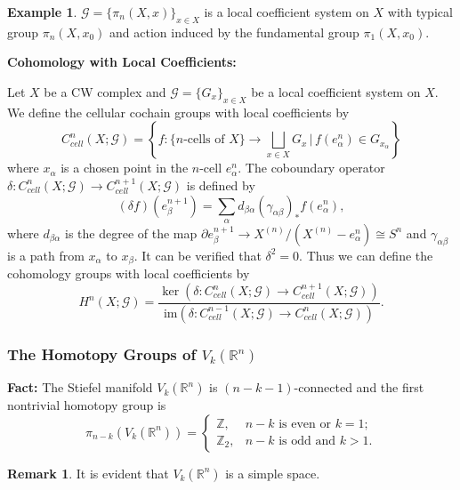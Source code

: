 \documentclass[12pt,a4paper]{article}
\theoremstyle{definition}
\newtheorem{example}[theorem]{\indent Example}
\newtheorem*{remark}{\noindent Remark}
\newcommand{\mZ}{\mathbb{Z}}
\newcommand{\mR}{\mathbb{R}}
\newcommand{\p}{\partial}
\begin{document}
\begin{example}
    $\mathcal{G} = \{\pi_n(X,x)\}_{x\in X}$ is a local coefficient system 
    on $X$ with typical group $\pi_n(X,x_0)$ and action induced by the 
    fundamental group $\pi_1(X,x_0)$.
\end{example}

\noindent\textbf{Cohomology with Local Coefficients:}

Let $X$ be a CW complex and $\mathcal{G} = \{G_x\}_{x\in X}$ be a local
coefficient system on $X$. We define the cellular cochain groups with local
coefficients by
\begin{equation*}
    C^n_{cell}(X;\mathcal{G}) = \left\{f:\big\{\text{$n$-cells of $X$}\big\}
    \to \bigsqcup_{x\in X}G_x \,\Big|\, f(e_\alpha^n)\in 
    G_{x_\alpha}\right\}
\end{equation*}
where $x_\alpha$ is a chosen point in the $n$-cell $e_\alpha^n$. The 
coboundary operator 
$\delta:C^n_{cell}(X;\mathcal{G})\to C^{n+1}_{cell}(X;\mathcal{G})$
is defined by 
\begin{equation*}
    (\delta f)(e_\beta^{n+1}) = \sum_\alpha d_{\beta\alpha}
    (\gamma_{\alpha\beta})_*f(e_\alpha^n),
\end{equation*}
where $d_{\beta\alpha}$ is the degree of the map 
$\p e_\beta^{n+1}\to X^{(n)}/(X^{(n)}-e^n_\alpha)\cong S^n$ and 
$\gamma_{\alpha\beta}$ is a path from $x_\alpha$ to $x_\beta$. It can be
verified that $\delta^2=0$. Thus we can define the cohomology groups with 
local coefficients by 
\begin{equation*}
    H^n(X;\mathcal{G}) = \frac{\ker(\delta:C^n_{cell}(X;\mathcal{G})\to 
    C^{n+1}_{cell}(X;\mathcal{G}))}{\mathrm{im}(\delta:C^{n-1}_{cell}(X;
    \mathcal{G})\to C^n_{cell}(X;\mathcal{G}))}.
\end{equation*}

\subsubsection*{The Homotopy Groups of $V_k(\mR^n)$}
\textbf{Fact:} The Stiefel manifold $V_k(\mR^n)$ is $(n-k-1)$-connected and 
the first nontrivial homotopy group is 
\begin{equation*}
    \pi_{n-k}(V_k(\mR^n)) = 
    \begin{cases}
        \mZ,& n-k \text{ is even or } k=1; \\
        \mZ_2,& n-k \text{ is odd and } k>1.
    \end{cases}
\end{equation*}
\begin{remark}
    It is evident that $V_k(\mR^n)$ is a simple space.
\end{remark}
\end{document}
